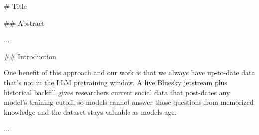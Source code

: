 # {Title}

## Abstract

...

## Introduction

One benefit of this approach and our work is that we always have up-to-date data that's not in the LLM pretraining window. A live Bluesky jetstream plus historical backfill gives researchers current social data that post-dates any model's training cutoff, so models cannot answer those questions from memorized knowledge and the dataset stays valuable as models age.

...

